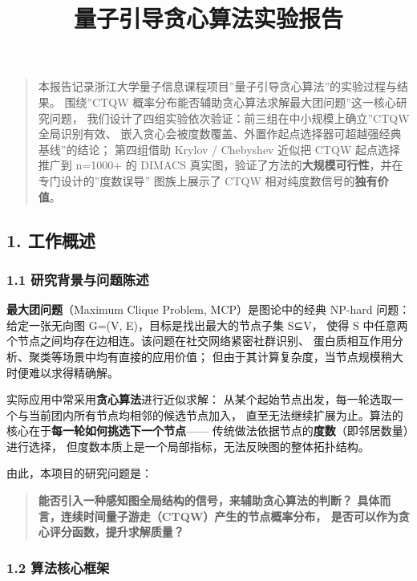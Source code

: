 \documentclass[
  11pt,
]{ctexart}
\title{量子引导贪心算法实验报告}
\author{}
\date{}
\begin{document}
\maketitle

\begin{quote}
本报告记录浙江大学量子信息课程项目''量子引导贪心算法''的实验过程与结果。
围绕''CTQW 概率分布能否辅助贪心算法求解最大团问题''这一核心研究问题，
我们设计了四组实验依次验证：前三组在中小规模上确立''CTQW 全局识别有效、
嵌入贪心会被度数覆盖、外置作起点选择器可超越强经典基线''的结论；
第四组借助 Krylov / Chebyshev 近似把 CTQW 起点选择推广到 n=1000+ 的
DIMACS
真实图，验证了方法的\textbf{大规模可行性}，并在专门设计的''度数误导''
图族上展示了 CTQW 相对纯度数信号的\textbf{独有价值}。
\end{quote}

\subsection{1. 工作概述}\label{ux5de5ux4f5cux6982ux8ff0}

\subsubsection{1.1
研究背景与问题陈述}\label{ux7814ux7a76ux80ccux666fux4e0eux95eeux9898ux9648ux8ff0}

\textbf{最大团问题}（Maximum Clique Problem, MCP）是图论中的经典 NP-hard
问题： 给定一张无向图 G=(V, E)，目标是找出最大的节点子集 S⊆V， 使得 S
中任意两个节点之间均存在边相连。该问题在社交网络紧密社群识别、
蛋白质相互作用分析、聚类等场景中均有直接的应用价值；
但由于其计算复杂度，当节点规模稍大时便难以求得精确解。

实际应用中常采用\textbf{贪心算法}进行近似求解：
从某个起始节点出发，每一轮选取一个与当前团内所有节点均相邻的候选节点加入，
直至无法继续扩展为止。算法的核心在于\textbf{每一轮如何挑选下一个节点}------
传统做法依据节点的\textbf{度数}（即邻居数量）进行选择，
但度数本质上是一个局部指标，无法反映图的整体拓扑结构。

由此，本项目的研究问题是：

\begin{quote}
\textbf{能否引入一种感知图全局结构的信号，来辅助贪心算法的判断？
具体而言，连续时间量子游走（CTQW）产生的节点概率分布，
是否可以作为贪心评分函数，提升求解质量？}
\end{quote}

\subsubsection{1.2
算法核心框架}\label{ux7b97ux6cd5ux6838ux5fc3ux6846ux67b6}
\end{document}
